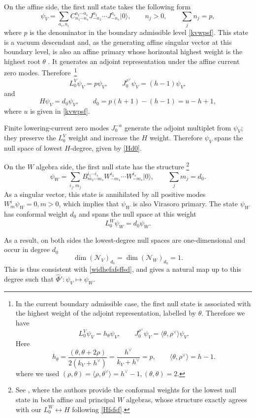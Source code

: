 \documentclass[a4paper,11pt]{article}
\theoremstyle{definition}
\theoremstyle{definition}
\theoremstyle{remark}
\newcommand{\be}{\begin{equation}}
\newcommand{\ee}{\end{equation}}
\begin{document}
On the affine side, the first  null state takes the following form
\be 
\psi_V=
\sum_{a_i,n_i } C^{a_1\cdots a_s}_{n_1\cdots n_s}
J^{a_1}_{-n_1}\cdots J^{a_s}_{-n_s}|0\rangle,
\qquad n_j>0, \qquad
\sum_jn_j=p,
\ee
where $p$ is the denominator in the boundary admissible level \eqref{kvwpsf}. 
This state is a vacuum descendant and, as the generating affine singular vector at this boundary level, is also an affine primary whose horizontal highest weight is the highest root $\theta$ \cite{Arakawa_2014}. It generates an adjoint representation under the affine current zero modes.    
Therefore~\footnote{In the current boundary admissible case, the first null state is associated with the highest weight of the adjoint representation, labelled by $\theta$.  Therefore we have 
\be
L_0^V\psi_V=h_\theta\psi_V, \qquad
J_0^{\rho^\vee}\psi_V
=\langle\theta,\rho^\vee\rangle\psi_V.
\ee
Here 
\be\nonumber
h_\theta=\frac{(\theta, \theta + 2\rho)}{2(k_V + h^\vee)} = \frac{h^\vee}{k_V + h^\vee} = p, \qquad
\langle\theta,\rho^\vee\rangle=h-1. 
\ee
where we used $(\rho, \theta) = \langle \rho, \theta^\vee \rangle = h^\vee - 1,(\theta, \theta) = 2$. 
 }
 \be
L_0^V\psi_V=p\psi_V,
\qquad
J_0^{\rho^\vee}\psi_V=(h-1)\psi_V,
\ee
and
\be \label{Hd0}
H\psi_V=d_0\psi_V,\qquad
d_0=p(h+1)-(h-1)=u-h+1,
\ee
where $u$ is given in \eqref{kvwpsf}.
 
 
 Finite lowering-current zero modes  $J_0^{-\alpha}$ generate the adjoint multiplet from $\psi_V$; they preserve the $L_0^V$ weight and increase the $H$ weight. Therefore $\psi_V$ spans the null space of lowest $H$-degree, given by \eqref{Hd0}.
 
 
 


On the $W$ algebra side, the first   null state     has the structure
\footnote{See  \cite[Lemma~3.3]{Creutzig:2020zaj}, where the authors provide  the conformal weights for the lowest null state in both affine and principal $W$ algebras, whose structure exactly agrees with our $L_0^W \leftrightarrow H$ following \eqref{Hfsfsf}.}
\be 
\psi_W=
\sum_{i_j,m_j} B^{i_1\cdots i_s}_{m_1\cdots m_s}
W^{i_1}_{-m_1}\cdots W^{i_s}_{-m_s}|0\rangle,
\qquad
\sum_jm_j=d_0. 
\ee
As a singular vector, this state is annihilated by all positive modes  
$
W^i_m\psi_W=0,   m>0 
$,
which implies that $ \psi_W$ is also  Virasoro primary. 
The state $\psi_W$ has conformal weight $d_0$ and spans the null space at this weight
\be
L_0^W \psi_W=d_0  \psi_W.
\ee

As a result, on both sides  the lowest-degree null spaces are one-dimensional and occur in degree $d_0$
\be
\dim(\mathcal N_V)_{d_0}
=
\dim(\mathcal N_W)_{d_0}
=1.
\ee
This is thus consistent with \eqref{widhefafsffsd}, and gives a natural map up to this degree such that $\widehat \Phi':\psi_V\mapsto \psi_W$.
  
\end{document}
